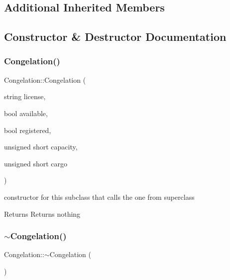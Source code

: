 \subsection*{Additional Inherited Members}


\subsection{Constructor \& Destructor Documentation}
\mbox{\label{class_congelation_a320f8a45809dbe0d770f9f77d49b3629}} 
\subsubsection{\texorpdfstring{Congelation()}{Congelation()}}
{\footnotesize\ttfamily Congelation\+::\+Congelation (\begin{DoxyParamCaption}\item[{string}]{license,  }\item[{bool}]{available,  }\item[{bool}]{registered,  }\item[{unsigned short}]{capacity,  }\item[{unsigned short}]{cargo }\end{DoxyParamCaption})}



constructor for this subclass that calls the one from superclass 

\begin{DoxyReturn}{Returns}
Returns nothing 
\end{DoxyReturn}
\mbox{\label{class_congelation_a7aa24e7127ec7c1d9d01043b665ae66f}} 
\subsubsection{\texorpdfstring{$\sim$\+Congelation()}{~Congelation()}}
{\footnotesize\ttfamily Congelation\+::$\sim$\+Congelation (\begin{DoxyParamCaption}{ }\end{DoxyParamCaption})\hspace{0.3cm}{\ttfamily [inline]}}



